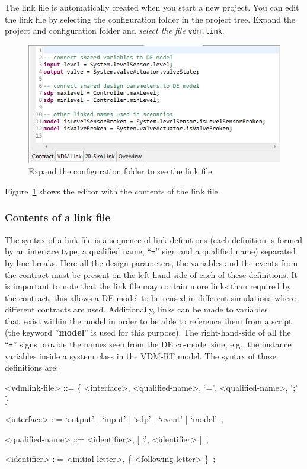 \documentclass{crescendorepchap}
\newcommand{\vdmkeyw}[1]{{\bf\ttfamily #1}}
\begin{document}
The link file is automatically created when you start a new project. You
can edit the link file by selecting the configuration folder in the
project tree. Expand the project and configuration folder and \emph{select the
  file} \texttt{vdm.link}.

\begin{figure}[htbp]
\centering
\includegraphics[width=.6\textwidth]{images/DestecsContractFile.png}
\caption{Expand the configuration folder to see the link file.\label{fig:linkfile}}
\end{figure}

\noindent Figure~\ref{fig:linkfile} shows the editor with the contents of the link file.

\subsubsection{Contents of a link file}

The syntax of a link file is a sequence of link definitions (each
definition is formed by an interface type, a qualified name, ``\texttt{=}'' sign
and a qualified name) separated by line breaks. Here all the design
parameters, the variables and the events from the contract must be
present on the left-hand-side of each of these definitions. It is
important to note that the link file may contain more links than
required by the contract, this allows a DE model to be reused in
different simulations where different contracts are used. Additionally,
links can be made to variables that~exist within the model in order to
be able to reference them from a script (the keyword ''\vdmkeyw{model}'' is used
for this purpose). The right-hand-side of all the ``\texttt{=}'' signs provide
the names seen from the DE co-model side, e.g., the instance variables
inside a system class in the VDM-RT model.
The syntax of these definitions are:

\begin{grammar}
<vdmlink-file> ::= \{ <interface>, <qualified-name>, `=', <qualified-name>, `;' \}

<interface> ::= `output' | `input'  | `sdp' | `event'  | `model'~;

<qualified-name> ::= <identifier>, {[} `.', <identifier> {]}~;

<identifier> ::= <initial-letter>, \{ <following-letter> \}~;
\end{grammar}
\end{document}
